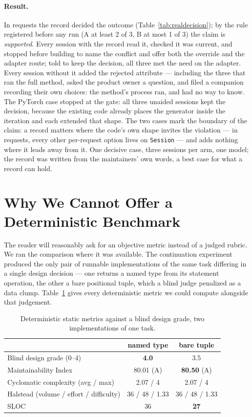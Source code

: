 \documentclass[11pt]{article}
\newcommand{\best}[1]{\textbf{#1}}
\begin{document}
\paragraph{Result.} In requests the record decided the outcome (Table~\ref{tab:realdecision}); by the rule registered before any run (A at least 2 of 3, B at most 1 of 3) the claim is \emph{supported}. Every session with the record read it, checked it was current, and stopped before building to name the conflict and offer both the override and the adapter route; told to keep the decision, all three met the need on the adapter. Every session without it added the rejected attribute --- including the three that ran the full method, asked the product owner a question, and filed a companion recording their own choices: the method's process ran, and had no way to know. The PyTorch case stopped at the gate: all three unaided sessions kept the decision, because the existing code already places the generator inside the iteration and each extended that shape. The two cases mark the boundary of the claim: a record matters where the code's own shape invites the violation --- in requests, every other per-request option lives on \texttt{Session} --- and adds nothing where it leads away from it. One decisive case, three sessions per arm, one model; the record was written from the maintainers' own words, a best case for what a record can hold.

\section{Why We Cannot Offer a Deterministic Benchmark}
\label{sec:measurement}

The reader will reasonably ask for an objective metric instead of a judged rubric. We ran the comparison where it was available. The continuation experiment produced the only pair of runnable implementations of the same task differing in a single design decision --- one returns a named type from its statement operation, the other a bare positional tuple, which a blind judge penalized as a data clump. Table~\ref{tab:radon} gives every deterministic metric we could compute alongside that judgement.

\begin{table}[h]
\centering\small
\caption{Deterministic static metrics against a blind design grade, two implementations of one task.}
\label{tab:radon}
\begin{tabular}{lcc}
\toprule
 & named type & bare tuple \\
\midrule
Blind design grade (0--4) & \best{4.0} & 3.5 \\
\midrule
Maintainability Index & 80.01 (A) & \best{80.50} (A) \\
Cyclomatic complexity (avg / max) & 2.07 / 4 & 2.07 / 4 \\
Halstead (volume / effort / difficulty) & 36 / 48 / 1.33 & 36 / 48 / 1.33 \\
SLOC & 36 & \best{27} \\
\bottomrule
\end{tabular}
\end{table}
\end{document}
